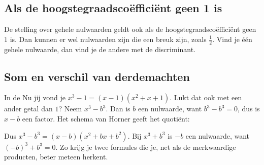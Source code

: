 \subsection{Als de hoogstegraadscoëfficiënt geen 1 is}

De stelling over gehele nulwaarden geldt ook als de hoogstegraadscoëfficiënt geen $1$ is. Dan kunnen er wel nulwaarden zijn die een breuk zijn, zoals $\tfrac12$. Vind je één gehele nulwaarde, dan vind je de andere met de discriminant.


\begin{oefeningen}

\end{oefeningen}

\subsection{Som en verschil van derdemachten}

In de Nu jij vond je $x^3 - 1 = (x - 1)(x^2 + x + 1)$. Lukt dat ook met een ander getal dan $1$? Neem $x^3 - b^3$. Dan is $b$ een nulwaarde, want $b^3 - b^3 = 0$, dus is $x - b$ een factor. Het schema van Horner geeft het quotiënt:

\begin{center}
\end{center}

Dus $x^3 - b^3 = (x - b)(x^2 + bx + b^2)$. Bij $x^3 + b^3$ is $-b$ een nulwaarde, want $(-b)^3 + b^3 = 0$. Zo krijg je twee formules die je, net als de merkwaardige producten, beter meteen herkent.

